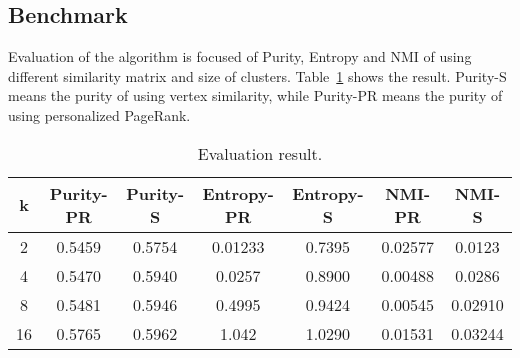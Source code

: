\documentclass{article}
\begin{document}
\subsection{Benchmark}
Evaluation of the algorithm is focused of Purity, Entropy and NMI
of using different similarity matrix and size of clusters.
Table~\ref{result} shows the result. Purity-S means the purity of
using vertex similarity, while Purity-PR means the purity of using
personalized PageRank.

\begin{table}[tbh]
  \center
  \footnotesize
  \begin{tabular}{c|c|c|c|c|c|c}
    \textbf{k} & \textbf{Purity-PR} & \textbf{Purity-S} & \textbf{Entropy-PR} & \textbf{Entropy-S} & \textbf{NMI-PR} & \textbf{NMI-S} \\
    \hline
    2 & 0.5459 & 0.5754 & 0.01233 & 0.7395 & 0.02577 & 0.0123 \\
    \hline
    4 & 0.5470 & 0.5940 & 0.0257 & 0.8900 & 0.00488 & 0.0286 \\
    \hline
    8 & 0.5481 & 0.5946 & 0.4995 & 0.9424 & 0.00545 & 0.02910 \\
    \hline
    16 & 0.5765 & 0.5962 & 1.042 & 1.0290 & 0.01531 & 0.03244 \\
  \end{tabular}
  \caption{Evaluation result.}
  \label{result}
\end{table}
\end{document}
